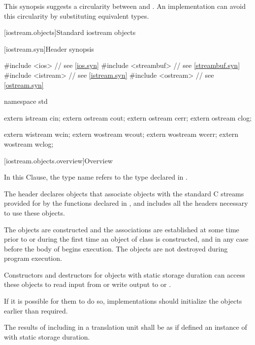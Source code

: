 \pnum
\begin{note}
This synopsis suggests a circularity between
and
.
An implementation can avoid this circularity by substituting equivalent
types.
\end{note}

[iostream.objects]{Standard iostream objects}

[iostream.syn]{Header  synopsis}

%
\begin{codeblock}
#include <ios>          // see \ref{ios.syn}
#include <streambuf>    // see \ref{streambuf.syn}
#include <istream>      // see \ref{istream.syn}
#include <ostream>      // see \ref{ostream.syn}

namespace std {
  extern istream cin;
  extern ostream cout;
  extern ostream cerr;
  extern ostream clog;

  extern wistream wcin;
  extern wostream wcout;
  extern wostream wcerr;
  extern wostream wclog;
}
\end{codeblock}

[iostream.objects.overview]{Overview}

\pnum
In this Clause, the type name  refers to
the type  declared in .

\pnum
The header 
declares objects that associate objects with the
standard C streams provided for by the functions declared in
, and includes all the headers necessary to use these objects.

\pnum
The objects are constructed and the associations are established at some
time prior to or during the first time an object of class
 is constructed, and in any case before the body
of  begins execution.
The objects are not destroyed during program execution.
\begin{footnote}
Constructors and destructors for objects with
static storage duration can
access these objects to read input from
or write output to
or
.
\end{footnote}

\pnum
\recommended
If it is possible for them to do so, implementations should
initialize the objects earlier than required.

\pnum
The results of including  in a translation unit shall be as if
 defined an instance of  with static
storage duration.

